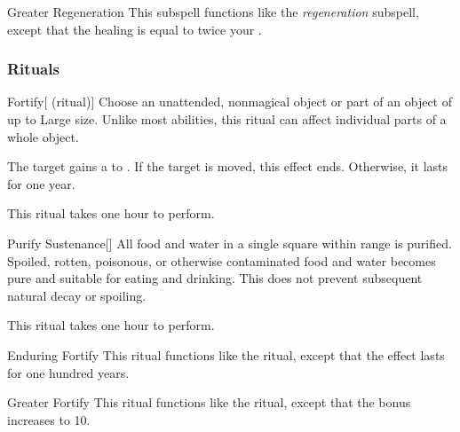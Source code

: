 \begin{ability}[\nth{7}]{Greater Regeneration}
This subspell functions like the \textit{regeneration} subspell, except that the healing is equal to twice your .
\end{ability}
\vspace{0.25em}



\subsubsection{Rituals}


\begin{ability}[\nth{1}]{Fortify}[ (ritual)]
Choose an unattended, nonmagical object or part of an object of up to Large size.
Unlike most abilities, this ritual can affect individual parts of a whole object.

The target gains a   to .
If the target is moved, this effect ends.
Otherwise, it lasts for one year.

This ritual takes one hour to perform.
\end{ability}
\vspace{0.25em}



\begin{ability}[\nth{1}]{Purify Sustenance}[]
All food and water in a single square within \rngclose range is purified.
Spoiled, rotten, poisonous, or otherwise contaminated food and water becomes pure and suitable for eating and drinking.
This does not prevent subsequent natural decay or spoiling.

This ritual takes one hour to perform.
\end{ability}
\vspace{0.25em}



\begin{ability}[\nth{3}]{Enduring Fortify}
This ritual functions like the  ritual, except that the effect lasts for one hundred years.
\end{ability}
\vspace{0.25em}



\begin{ability}[\nth{3}]{Greater Fortify}
This ritual functions like the  ritual, except that the  bonus increases to 10.
\end{ability}
\vspace{0.25em}



